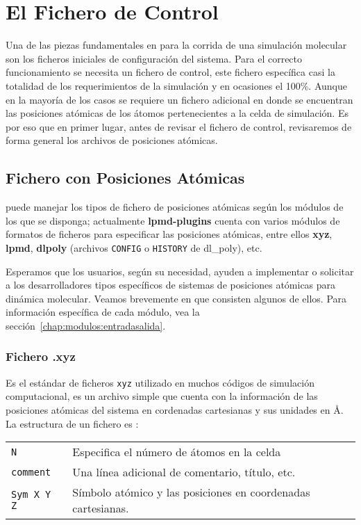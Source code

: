 \chapter{El Fichero de Control}
\label{chap:input}

Una de las piezas fundamentales en {\lpmd} para la corrida de una simulaci\'on molecular son los ficheros iniciales de configuraci\'on del sistema. Para el correcto funcionamiento se necesita un fichero de control, este fichero espec\'ifica casi la totalidad de los requerimientos de la simulaci\'on y en ocasiones el 100\%. Aunque en la mayor\'ia de los casos se requiere un fichero adicional en donde se encuentran las posiciones at\'omicas de los \'atomos pertenecientes a la celda de simulaci\'on. Es por eso que en primer lugar, antes de revisar el fichero de control, revisaremos de forma general los archivos de posiciones at\'omicas.

\section{Fichero con Posiciones At\'omicas}

{\lpmd} puede manejar los tipos de fichero de posiciones at\'omicas seg\'un los m\'odulos de los que se disponga; actualmente \textbf{lpmd-plugins} cuenta con varios m\'odulos de formatos de ficheros para especificar las posiciones at\'omicas, entre ellos \textbf{xyz}, \textbf{lpmd}, \textbf{dlpoly} (archivos \verb|CONFIG| o \verb|HISTORY| de dl\_poly), etc.

Esperamos que los usuarios, seg\'un su necesidad, ayuden a implementar o solicitar a los desarrolladores tipos espec\'ificos de sistemas de posiciones at\'omicas para din\'amica molecular. Veamos brevemente en que consisten algunos de ellos. Para informaci\'on espec\'ifica de cada m\'odulo, vea la secci\'on~\ref{chap:modulos:entradasalida}.

\subsection{Fichero .xyz}

Es el est\'andar de ficheros \verb|xyz| utilizado en muchos c\'odigos de simulaci\'on computacional, es un archivo simple que cuenta con la informaci\'on de las posiciones at\'omicas del sistema en cordenadas cartesianas y sus unidades en \AA. La estructura de un fichero es :
\begin{center}
\begin{tabular}{l|l}
 \verb|N| & Especifica el n\'umero de \'atomos en la celda \\
 \verb|comment| & Una l\'inea adicional de comentario, t\'itulo, etc. \\
 \verb|Sym X Y Z| & S\'imbolo at\'omico y las posiciones en coordenadas cartesianas. \\
\end{tabular}
\end{center}

